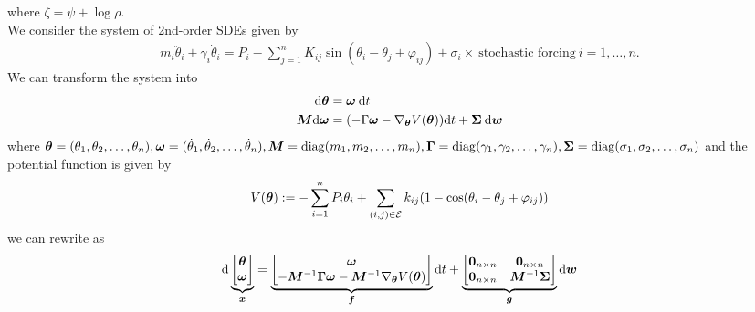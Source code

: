 \documentclass[11pt,twoside,a4paper]{article}
\begin{document}
 where $\zeta = \psi + \log \rho $.
\\ 
We consider the system of 2nd-order SDEs given by
\begin{align*}
m_i\ddot{\theta}_i
    +  \gamma_i \dot{\theta}_i = 
P_i - \sum_{j=1}^{n} K_{ij} \sin(\theta_i-\theta_j+\varphi_{ij})+ \sigma_i \times \:\text{stochastic forcing}\: i=1,\dots,n.
\end{align*}
We can transform the system into 
\begin{align} \label{ODEsystem}
    {\rm{d}} {\bm{\theta}} &= {\bm{\omega}} \: {\rm{d}} t \nonumber \\ 
   {\bm{M}} {\rm{d}} {\bm{\omega}} & = (-\Gamma {\bm{\omega}}-\nabla_{{\bm{\theta}}} V({\bm{\theta}})) {\rm{d}} t + {\bm{\Sigma}} \: {\rm{d}} {\bm{w}}
\end{align}
where ${\bm{\theta}}=(\theta_1,\theta_2,\dots,\theta_n), {\bm{\omega}}=(\dot{\theta}_1,\dot{\theta}_2,\dots,\dot{\theta}_n), {\bm{M}} = {\rm{diag}}(m_1,m_2,\dots,m_n), \bm{\Gamma}= {\rm{diag}}(\gamma_1,\gamma_2,\dots,\gamma_n ),{\bm{\Sigma}} = {\rm{diag}}(\sigma_1,\sigma_2,\dots,\sigma_n)$ and the potential function is given by 
\begin{align}
    V({\bm{\theta}}):= -\sum_{i=1}^{n} P_i \theta_i + \sum_{(i,j)\in \mathcal{E}}k_{ij}(1-\cos(\theta_i-\theta_j+\varphi_{ij}))
\end{align}
we can rewrite as 
\begin{align}
    {\rm{d}} \underbrace{\begin{bmatrix}
    {\bm{\theta}} \\ {\bm{\omega}} 
    \end{bmatrix}}_{{\bm{x}}}
    = \underbrace{\begin{bmatrix}
    {\bm{\omega}}  \\ 
 -{\bm{M}}^{-1}\bm{\Gamma} {\bm{\omega}} - {\bm{M}}^{-1} \nabla_{{\bm{\theta}}} V({\bm{\theta}})
    \end{bmatrix}}_{\bm{f}} {\rm{d}} t + 
    \underbrace{\begin{bmatrix}
    \bm{0}_{n\times n}  &  \bm{0}_{n\times n}  \\ 
   \bm{0}_{n\times n}  &\bm M^{-1}{\bm{\Sigma}}  
    \end{bmatrix}}_{\bm{g}}
    {\rm{d}} \bm{w}
    \end{align}
\end{document}
